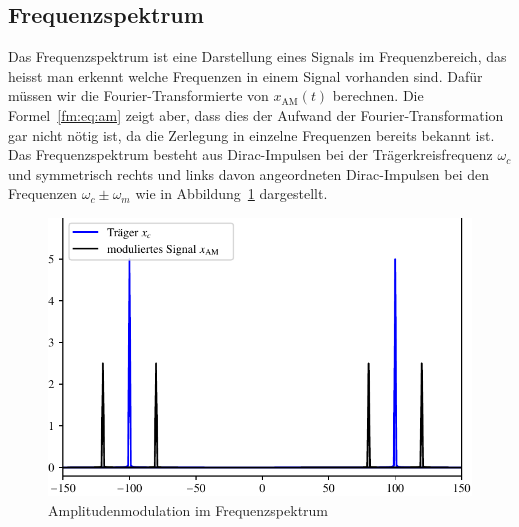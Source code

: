 \subsection{Frequenzspektrum}
Das Frequenzspektrum ist eine Darstellung eines Signals im
Frequenzbereich, das heisst man erkennt welche Frequenzen in einem
Signal vorhanden sind.
Dafür müssen wir die Fourier-Transformierte von \(x_{\text{AM}}(t)\)
berechnen.
Die Formel~\eqref{fm:eq:am} zeigt aber, dass dies der Aufwand
der Fourier-Transformation gar nicht nötig ist, da die Zerlegung
in einzelne Frequenzen bereits bekannt ist.
Das Frequenzspektrum besteht aus Dirac-Impulsen bei der Trägerkreisfrequenz
$\omega_c$ und symmetrisch rechts und links davon angeordneten
Dirac-Impulsen bei den Frequenzen $\omega_c\pm \omega_m$
wie in Abbildung~\ref{fig:AM_frequency} dargestellt.


\begin{figure}
\centering
\includegraphics{papers/fm/images/amfrequency.pdf}
%
\caption{Amplitudenmodulation im Frequenzspektrum}
\label{fig:AM_frequency}
\end{figure}

